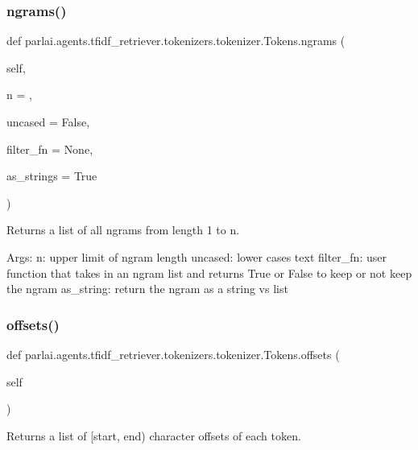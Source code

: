 \subsubsection{\texorpdfstring{ngrams()}{ngrams()}}
{\footnotesize\ttfamily def parlai.\+agents.\+tfidf\+\_\+retriever.\+tokenizers.\+tokenizer.\+Tokens.\+ngrams (\begin{DoxyParamCaption}\item[{}]{self,  }\item[{}]{n = {},  }\item[{}]{uncased = {\ttfamily False},  }\item[{}]{filter\+\_\+fn = {\ttfamily None},  }\item[{}]{as\+\_\+strings = {\ttfamily True} }\end{DoxyParamCaption})}

\begin{DoxyVerb}Returns a list of all ngrams from length 1 to n.

Args:
    n: upper limit of ngram length
    uncased: lower cases text
    filter_fn: user function that takes in an ngram list and returns
      True or False to keep or not keep the ngram
    as_string: return the ngram as a string vs list
\end{DoxyVerb}
 \mbox{\label{classparlai_1_1agents_1_1tfidf__retriever_1_1tokenizers_1_1tokenizer_1_1Tokens_ad64d5292cef77a2a02193ba836875ba7}} 
\subsubsection{\texorpdfstring{offsets()}{offsets()}}
{\footnotesize\ttfamily def parlai.\+agents.\+tfidf\+\_\+retriever.\+tokenizers.\+tokenizer.\+Tokens.\+offsets (\begin{DoxyParamCaption}\item[{}]{self }\end{DoxyParamCaption})}

\begin{DoxyVerb}Returns a list of [start, end) character offsets of each token.
\end{DoxyVerb}
 \mbox{\label{classparlai_1_1agents_1_1tfidf__retriever_1_1tokenizers_1_1tokenizer_1_1Tokens_a5aa226b8190b5e72dbe0515caf0a21d6}} 
